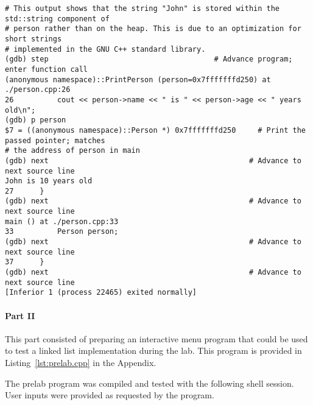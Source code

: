 \documentclass[11pt, letterpaper]{article} %
\begin{document}
\begin{lstlisting}[style=labreportstyle-sh,escapechar=!]
# This output shows that the string "John" is stored within the std::string component of
# person rather than on the heap. This is due to an optimization for short strings
# implemented in the GNU C++ standard library.
(gdb) step                                      # Advance program; enter function call
(anonymous namespace)::PrintPerson (person=0x7fffffffd250) at ./person.cpp:26
26          cout << person->name << " is " << person->age << " years old\n";
(gdb) p person
$7 = ((anonymous namespace)::Person *) 0x7fffffffd250     # Print the passed pointer; matches
# the address of person in main
(gdb) next                                              # Advance to next source line
John is 10 years old
27      }
(gdb) next                                              # Advance to next source line
main () at ./person.cpp:33
33          Person person;
(gdb) next                                              # Advance to next source line
37      }
(gdb) next                                              # Advance to next source line
[Inferior 1 (process 22465) exited normally]
\end{lstlisting}


\paragraph{Part II}
This part consisted of preparing an interactive menu program that could be used to test a linked list implementation during the lab. This program is provided in Listing~\ref{lst:prelab.cpp} in the Appendix. 

The prelab program was compiled and tested with the following shell session. User inputs were provided as requested by the program.
\end{document}
